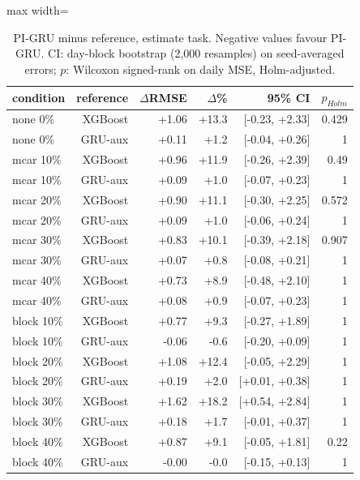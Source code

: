 \begin{table}[H]
\centering\small
\caption{PI-GRU minus reference, estimate task. Negative values favour PI-GRU. CI: day-block bootstrap (2,000 resamples) on seed-averaged errors; $p$: Wilcoxon signed-rank on daily MSE, Holm-adjusted.}\label{tab:sig_estimate}
\begin{adjustbox}{max width=\textwidth}
\begin{tabular}{lrrrrr}
\toprule
condition & reference & $\Delta$RMSE & $\Delta$\% & 95\% CI & $p_{Holm}$ \\
\midrule
none 0\% & XGBoost & +1.06 & +13.3 & [-0.23, +2.33] & 0.429 \\
none 0\% & GRU-aux & +0.11 & +1.2 & [-0.04, +0.26] & 1 \\
mcar 10\% & XGBoost & +0.96 & +11.9 & [-0.26, +2.39] & 0.49 \\
mcar 10\% & GRU-aux & +0.09 & +1.0 & [-0.07, +0.23] & 1 \\
mcar 20\% & XGBoost & +0.90 & +11.1 & [-0.30, +2.25] & 0.572 \\
mcar 20\% & GRU-aux & +0.09 & +1.0 & [-0.06, +0.24] & 1 \\
mcar 30\% & XGBoost & +0.83 & +10.1 & [-0.39, +2.18] & 0.907 \\
mcar 30\% & GRU-aux & +0.07 & +0.8 & [-0.08, +0.21] & 1 \\
mcar 40\% & XGBoost & +0.73 & +8.9 & [-0.48, +2.10] & 1 \\
mcar 40\% & GRU-aux & +0.08 & +0.9 & [-0.07, +0.23] & 1 \\
block 10\% & XGBoost & +0.77 & +9.3 & [-0.27, +1.89] & 1 \\
block 10\% & GRU-aux & -0.06 & -0.6 & [-0.20, +0.09] & 1 \\
block 20\% & XGBoost & +1.08 & +12.4 & [-0.05, +2.29] & 1 \\
block 20\% & GRU-aux & +0.19 & +2.0 & [+0.01, +0.38] & 1 \\
block 30\% & XGBoost & +1.62 & +18.2 & [+0.54, +2.84] & 1 \\
block 30\% & GRU-aux & +0.18 & +1.7 & [-0.01, +0.37] & 1 \\
block 40\% & XGBoost & +0.87 & +9.1 & [-0.05, +1.81] & 0.22 \\
block 40\% & GRU-aux & -0.00 & -0.0 & [-0.15, +0.13] & 1 \\
\bottomrule
\end{tabular}
\end{adjustbox}
\end{table}
